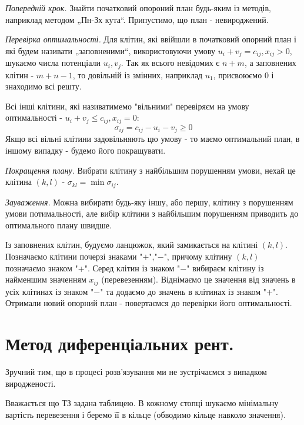 \documentclass[12pt,a4paper]{report}
\newenvironment{slim_enumerate}{
\begin{enumerate}
  \setlength{\itemsep}{1pt}
  \setlength{\parskip}{0pt}
  \setlength{\parsep}{0pt}}
{\end{enumerate}}
\begin{document}
\begin{slim_enumerate}
  \item \emph{Попередній крок.} Знайти початковий опороний план будь-яким із методів, наприклад методом „Пн-Зх кута“. Припустимо, що план - невироджений.

  \item \emph{Перевірка оптимальності.} Для клітин, які ввійшли в початковий опорний план і які будем називати „заповненими“, використовуючи умову $u_i + v_j = c_{ij}, x_{ij} > 0$, шукаємо числа потенціали $u_i, v_j$. Так як всього невідомих є $n+m$, а заповнених клітин - $m+n-1$, то довільній із змінних, наприклад $u_1$, присвоюємо $0$ і знаходимо всі решту.

Всі інші клітини, які називатимемо "вільними" перевіряєм на умову оптимальності - $u_i + v_j \leq c_{ij}, x_{ij} = 0$:
\begin{equation} \sigma_{ij} = c_{ij} - u_i - v_j \geq 0\end{equation}
Якщо всі вільні клітини задовільняють цю умову - то маємо оптимальний план, в іншому випадку - будемо його покращувати.

  \item \emph{Покращення плану.} Вибрати клітину з найбільшим порушенням умови, нехай це клітина $(k,l)$ - $\sigma_{kl} = \min \sigma_{ij}$.

\emph{Зауваження.} Можна вибирати будь-яку іншу, або першу, клітину з порушенням умови потимальності, але вибір клітини з найбільшим порушенням приводить до оптимального плану швидше.

Із заповнених клітин, будуємо ланцюжок, який замикається на клітині $(k,l)$. Позначаємо клітини почерзі знаками "$+$","$-$", причому клітину $(k,l)$ позначаємо знаком "+". Серед клітин із знаком "$-$" вибираєм клітину із найменшим значенням $x_{ij}$ (перевезенням). Віднімаємо це значення від значень в усіх клітинах із знаком "$-$" та додаємо до значень в клітинах із знаком "$+$". Отримали новий опорний план - повертаємся до перевірки його оптимальності.
\end{slim_enumerate}

\clearpage

\chapter{Метод диференціальних рент.}

Зручний тим, що в процесі розв’язування ми не зустрічаємся з випадком виродженості.

Вважається що ТЗ задана таблицею. В кожному стопці шукаємо мінімальну вартість перевезення і беремо її в кільце (обводимо кільце навколо значення).
\end{document}
